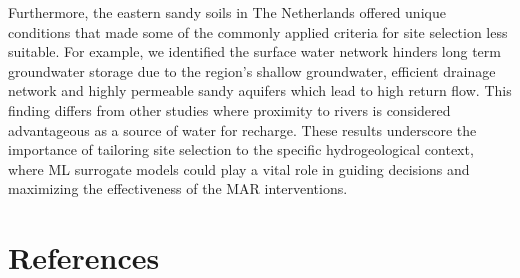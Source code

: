 \documentclass[
]{agujournal2019}
\begin{document}
Furthermore, the eastern sandy soils in The Netherlands offered unique
conditions that made some of the commonly applied criteria for site
selection less suitable. For example, we identified the surface water
network hinders long term groundwater storage due to the region's
shallow groundwater, efficient drainage network and highly permeable
sandy aquifers which lead to high return flow. This finding differs from
other studies where proximity to rivers is considered advantageous as a
source of water for recharge. These results underscore the importance of
tailoring site selection to the specific hydrogeological context, where
ML surrogate models could play a vital role in guiding decisions and
maximizing the effectiveness of the MAR interventions.

\section*{References}\label{references}
\end{document}
